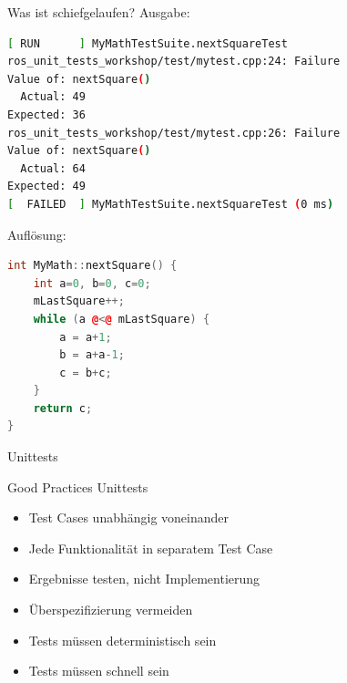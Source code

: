 \documentclass{beamer}
\begin{document}
\begin{frame}[fragile]{Was ist schiefgelaufen?}
Ausgabe:
\begin{lstlisting}[language=bash, numbers=none]
[ RUN      ] MyMathTestSuite.nextSquareTest
ros_unit_tests_workshop/test/mytest.cpp:24: Failure
Value of: nextSquare()
  Actual: 49
Expected: 36
ros_unit_tests_workshop/test/mytest.cpp:26: Failure
Value of: nextSquare()
  Actual: 64
Expected: 49
[  FAILED  ] MyMathTestSuite.nextSquareTest (0 ms)
\end{lstlisting}
\pause
Auflösung:
\begin{lstlisting}[language=c++, style=using_colors]
int MyMath::nextSquare() {
	int a=0, b=0, c=0;
	mLastSquare++;
	while (a @<@ mLastSquare) {
		a = a+1;
		b = a+a-1;
		c = b+c;
	}
	return c;
}
\end{lstlisting}
\end{frame}

\begin{frame}{Unittests}
	\begin{block}{Good Practices Unittests}
	\begin{itemize}
		\item Test Cases unabhängig voneinander
		\item Jede Funktionalität in separatem Test Case
		\item Ergebnisse testen, nicht Implementierung
		\item Überspezifizierung vermeiden
		\item Tests müssen deterministisch sein
		\item Tests müssen schnell sein
	\end{itemize}
	\end{block}
\end{frame}
\end{document}
